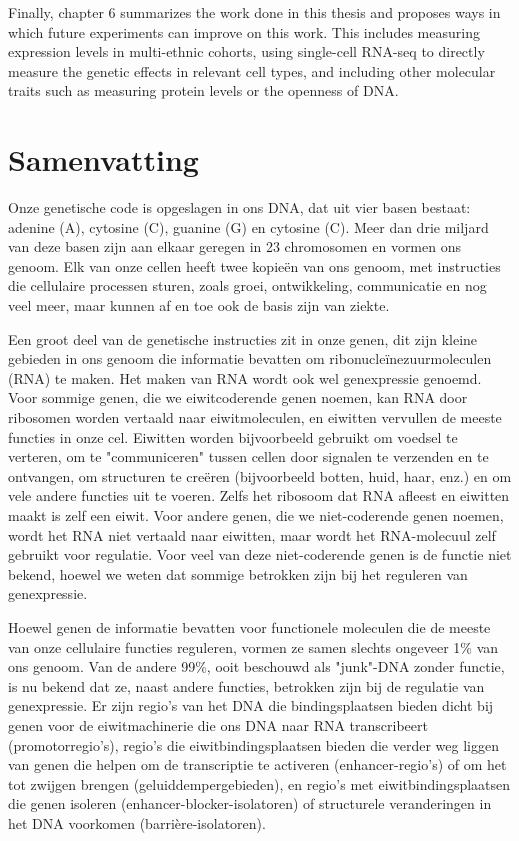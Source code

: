 \begin{appendices}
Finally, chapter 6 summarizes the work done in this thesis and proposes ways in which future experiments can improve on this work. This includes measuring expression levels in multi-ethnic cohorts, using single-cell RNA-seq to directly measure the genetic effects in relevant cell types, and including other molecular traits such as measuring protein levels or the openness of DNA.




\chapter{Samenvatting}
Onze genetische code is opgeslagen in ons DNA, dat uit vier basen bestaat: adenine (A), cytosine (C), guanine (G) en cytosine (C). Meer dan drie miljard van deze basen zijn aan elkaar geregen in 23 chromosomen en vormen ons genoom. Elk van onze cellen heeft twee kopieën van ons genoom, met instructies die cellulaire processen sturen, zoals groei, ontwikkeling, communicatie en nog veel meer, maar kunnen af en toe ook de basis zijn van ziekte.

Een groot deel van de genetische instructies zit in onze genen, dit zijn kleine gebieden in ons genoom die informatie bevatten om ribonucleïnezuurmoleculen (RNA) te maken. Het maken van RNA wordt ook wel genexpressie genoemd. Voor sommige genen, die we eiwitcoderende genen noemen, kan RNA door ribosomen worden vertaald naar eiwitmoleculen, en eiwitten vervullen de meeste functies in onze cel. Eiwitten worden bijvoorbeeld gebruikt om voedsel te verteren, om te "communiceren" tussen cellen door signalen te verzenden en te ontvangen, om structuren te creëren (bijvoorbeeld botten, huid, haar, enz.) en om vele andere functies uit te voeren. Zelfs het ribosoom dat RNA afleest en eiwitten maakt is zelf een eiwit. Voor andere genen, die we niet-coderende genen noemen, wordt het RNA niet vertaald naar eiwitten, maar wordt het RNA-molecuul zelf gebruikt voor regulatie. Voor veel van deze niet-coderende genen is de functie niet bekend, hoewel we weten dat sommige betrokken zijn bij het reguleren van genexpressie.

Hoewel genen de informatie bevatten voor functionele moleculen die de meeste van onze cellulaire functies reguleren, vormen ze samen slechts ongeveer 1\% van ons genoom. Van de andere 99\%, ooit beschouwd als "junk"-DNA zonder functie, is nu bekend dat ze, naast andere functies, betrokken zijn bij de regulatie van genexpressie. Er zijn regio's van het DNA die bindingsplaatsen bieden dicht bij genen voor de eiwitmachinerie die ons DNA naar RNA transcribeert (promotorregio's), regio’s die eiwitbindingsplaatsen bieden die verder weg liggen van genen die helpen om de transcriptie te activeren (enhancer-regio's) of om het tot zwijgen brengen (geluiddempergebieden), en regio’s met eiwitbindingsplaatsen die genen isoleren (enhancer-blocker-isolatoren) of structurele veranderingen in het DNA voorkomen (barrière-isolatoren).


\end{appendices}

